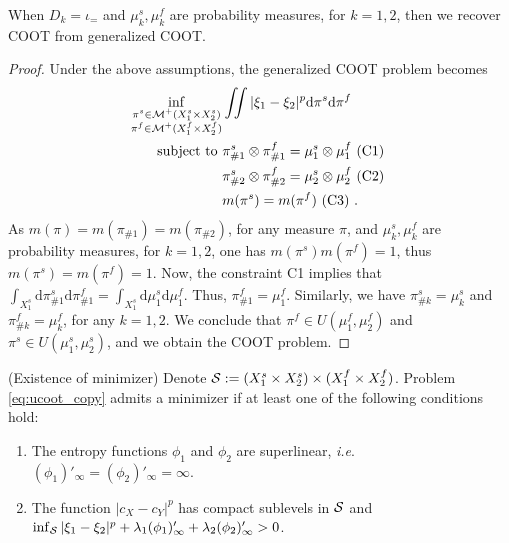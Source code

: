\begin{claim}
  When $D_k = \iota_{=}$ and $\mu_k^s, \mu_k^f$ are probability measures, for $k=1,2$,
  then we recover COOT from generalized COOT.
\end{claim}
\begin{proof}
  Under the above assumptions, the generalized COOT problem becomes
  \begin{equation}
    \begin{split}
      \inf_{\substack{\pi^s \in \mathcal M^+(X_1^s \times X_2^s) \\
      \pi^f \in \mathcal M^+(X_1^f \times X_2^f)}}
      &\iint |\xi_1 - \xi_2|^p \mathrm d\pi^s \mathrm d \pi^f \\
      \text{subject to } &\pi^s_{\#1} \otimes \pi^f_{\#1} = \mu_1^s \otimes \mu_1^f \text{ (C1) } \\
      & \pi^s_{\#2} \otimes \pi^f_{\#2} = \mu_2^s \otimes \mu_2^f \text{ (C2) } \\
      & m(\pi^s) = m(\pi^f) \text{ (C3) }.
    \end{split}
  \end{equation}
  As $m(\pi) = m(\pi_{\#1}) = m(\pi_{\#2})$,
  for any measure $\pi$, and $\mu_k^s, \mu_k^f$ are probability measures, for $k=1,2$,
  one has $m(\pi^s) m(\pi^f) = 1$, thus $m(\pi^s) = m(\pi^f) = 1$.
  Now, the constraint C1 implies that
  $\int_{X_1^s} \mathrm d\pi^s_{\#1} \mathrm d \pi^f_{\#1}
  = \int_{X_1^s} \mathrm d\mu_1^s \mathrm d\mu_1^f$. Thus, $\pi^f_{\#1} = \mu_1^f$.
  Similarly, we have $\pi^s_{\#k} = \mu_k^s$ and $\pi^f_{\#k} = \mu_k^f$, for any $k=1,2$.
  We conclude that $\pi^f \in U(\mu_1^f, \mu_2^f)$ and $\pi^s \in U(\mu_1^s, \mu_2^s)$,
  and we obtain the COOT problem.
\end{proof}

\begin{proposition}
    \label{eq:ucoot_existence_copy}
  (Existence of minimizer) Denote
  $\mathcal S := (X_1^s \times X_2^s) \times (X_1^f \times X_2^f)$.
  Problem \eqref{eq:ucoot_copy} admits a minimizer if at least one of
  the following conditions hold:
  \begin{enumerate}
    \item The entropy functions $\phi_1$ and $\phi_2$ are superlinear, \textit{i.e}.
    $(\phi_1)'_{\infty} = (\phi_2)'_{\infty} = \infty$.
    \item The function $\vert c_X - c_Y \vert^p$ has compact sublevels in $\mathcal S$ and
    $\inf_{\mathcal S} \vert \xi_1 - \xi_2 \vert^p + \lambda_1 (\phi_1)'_{\infty} + \lambda_2 (\phi_2)'_{\infty} > 0$.
  \end{enumerate}
\end{proposition}

